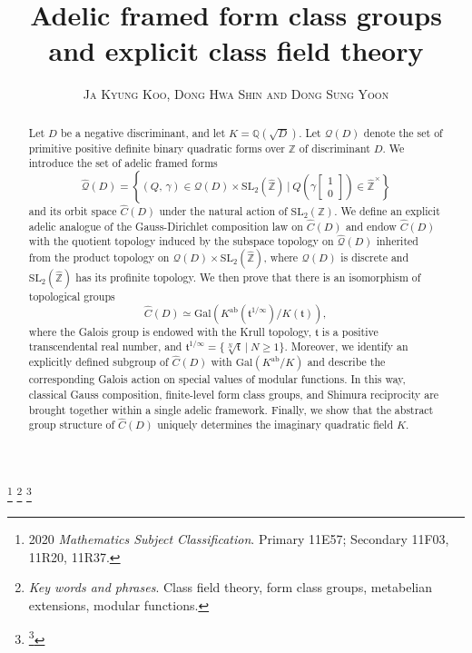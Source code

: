 \documentclass[reqno,11pt]{article}
\title{Adelic framed form class groups and explicit class field theory}
\author{
\textsc{Ja Kyung Koo, Dong Hwa Shin and Dong Sung Yoon} %
}
\date{} %
\theoremstyle{plain} %
\theoremstyle{definition} %
\begin{document}
\allowdisplaybreaks

\maketitle

\footnote{ %
2020 \textit{Mathematics Subject Classification}. Primary 11E57; Secondary 11F03, 11R20, 11R37.}
\footnote{ %
\textit{Key words and phrases}. Class field theory, form class groups, metabelian extensions,
modular functions.} \footnote{
\thanks{}
}

\begin{abstract}
Let $D$ be a negative discriminant, and let $K=\mathbb{Q}(\sqrt{D})$. 
Let $\mathcal{Q}(D)$ denote the set of primitive positive definite binary quadratic
forms over $\mathbb{Z}$ of discriminant $D$. 
We introduce the set of adelic framed forms
\begin{equation*}
\widehat{\mathcal{Q}}(D)=
\left\{(Q,\,\gamma)\in
\mathcal{Q}(D)\times\mathrm{SL}_2(\widehat{\mathbb{Z}})~|~
Q\left(\gamma\begin{bmatrix}1\\0\end{bmatrix}\right)\in
\widehat{\mathbb{Z}}^\times\right\}
\end{equation*}
and its orbit space $\widehat{C}(D)$ under the natural action of $\mathrm{SL}_2(\mathbb{Z})$.
We define an explicit adelic analogue of the Gauss-Dirichlet composition law
on $\widehat{C}(D)$ and endow $\widehat{C}(D)$ with the quotient topology induced 
by the subspace topology on $\widehat{\mathcal{Q}}(D)$
inherited from the product topology
on $\mathcal{Q}(D)\times\mathrm{SL}_2(\widehat{\mathbb{Z}})$,
where
$\mathcal{Q}(D)$ is discrete
and $\mathrm{SL}_2(\widehat{\mathbb{Z}})$ has its profinite topology. 
We then prove that 
there is an isomorphism of topological groups
\begin{equation*}
\widehat{C}(D)\simeq\mathrm{Gal}\left(K^\mathrm{ab}(\mathfrak{t}^{1/\infty})/K(\mathfrak{t})\right),
\end{equation*}
where the Galois group is endowed with the Krull topology, 
$\mathfrak{t}$ is a positive transcendental real number, and $\mathfrak{t}^{1/\infty}=\{\sqrt[N]{\mathfrak{t}}~|~N\geq1\}$. 
Moreover, we identify an explicitly defined subgroup of 
$\widehat{C}(D)$ with
$\mathrm{Gal}(K^\mathrm{ab}/K)$ and 
describe the corresponding Galois action on special values of modular functions.
In this way, classical Gauss composition, finite-level form class groups, and Shimura reciprocity are brought together within a single adelic framework.
Finally, we show that the abstract group structure of 
$\widehat{C}(D)$ uniquely determines the imaginary quadratic field $K$.
\end{abstract}
\end{document}
